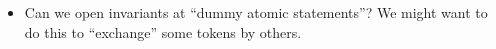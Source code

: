 
\subsection{}
\begin{itemize}
\item Can we open invariants at ``dummy atomic statements''? We might want to do this to ``exchange'' some tokens by others.
\end{itemize}